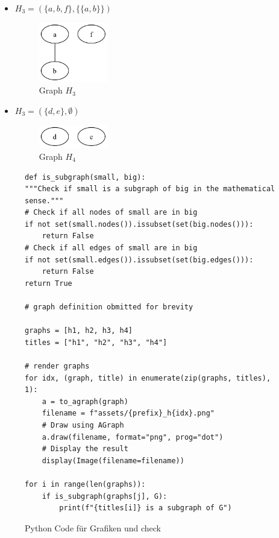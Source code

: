 \documentclass[a4paper,11pt]{report}
\begin{document}
\begin{itemize}
    \item $H_3 = (\{ a, b, f\}, \{ \{a, b\}\})$
    \begin{figure}[htbp]
        \centering
        \includegraphics[width=3cm]{notebook/assets/aufgabe_04_h3.png}
        \caption{Graph $H_3$}
        \label{fig:graph_h_3}
    \end{figure}
    \item $H_3 = (\{ d, e\},\emptyset)$
    \begin{figure}[htbp]
        \centering
        \includegraphics[width=3cm]{notebook/assets/aufgabe_04_h4.png}
        \caption{Graph $H_4$}
        \label{fig:graph_h_4}
    \end{figure}
\end{itemize}

\begin{figure}
    \centering
    \begin{verbatim}
def is_subgraph(small, big):
"""Check if small is a subgraph of big in the mathematical sense."""
# Check if all nodes of small are in big
if not set(small.nodes()).issubset(set(big.nodes())):
    return False
# Check if all edges of small are in big
if not set(small.edges()).issubset(set(big.edges())):
    return False
return True

# graph definition obmitted for brevity

graphs = [h1, h2, h3, h4]
titles = ["h1", "h2", "h3", "h4"]

# render graphs
for idx, (graph, title) in enumerate(zip(graphs, titles), 1):
    a = to_agraph(graph)
    filename = f"assets/{prefix}_h{idx}.png"
    # Draw using AGraph
    a.draw(filename, format="png", prog="dot")
    # Display the result
    display(Image(filename=filename))

for i in range(len(graphs)):
    if is_subgraph(graphs[j], G):
        print(f"{titles[i]} is a subgraph of G")
    \end{verbatim}
    \caption{Python Code für Grafiken und check}
    \label{fig:is_subgraph}
\end{figure}
\end{document}
